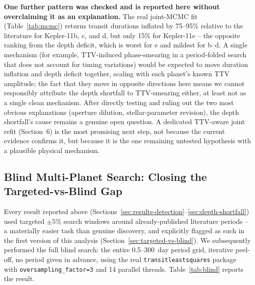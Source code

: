 \documentclass[11pt]{article}
\begin{document}
\textbf{One further pattern was checked and is reported here without overclaiming it as an explanation.} The real joint-MCMC fit (Table~\ref{tab:mcmc}) returns transit durations inflated by 75--95\% relative to the literature for Kepler-11b, c, and d, but only 15\% for Kepler-11e -- the opposite ranking from the depth deficit, which is worst for e and mildest for b--d. A single mechanism (for example, TTV-induced phase-smearing in a period-folded search that does not account for timing variations) would be expected to move duration inflation and depth deficit together, scaling with each planet's known TTV amplitude; the fact that they move in opposite directions here means we cannot responsibly attribute the depth shortfall to TTV-smearing either, at least not as a single clean mechanism. After directly testing and ruling out the two most obvious explanations (aperture dilution, stellar-parameter revision), the depth shortfall's cause remains a genuine open question. A dedicated TTV-aware joint refit (Section~6) is the most promising next step, not because the current evidence confirms it, but because it is the one remaining untested hypothesis with a plausible physical mechanism.

\subsection{Blind Multi-Planet Search: Closing the Targeted-vs-Blind Gap}
\label{sec:blind}

Every result reported above (Sections~\ref{sec:results-detection}--\ref{sec:depth-shortfall}) used targeted $\pm5\%$ search windows around already-published literature periods -- a materially easier task than genuine discovery, and explicitly flagged as such in the first version of this analysis (Section~\ref{sec:targeted-vs-blind}). We subsequently performed the full blind search: the entire 0.5--300~day period grid, iterative peel-off, no period given in advance, using the real \texttt{transitleastsquares} package with \texttt{oversampling\_factor=3} and 14 parallel threads. Table~\ref{tab:blind} reports the result.
\end{document}
